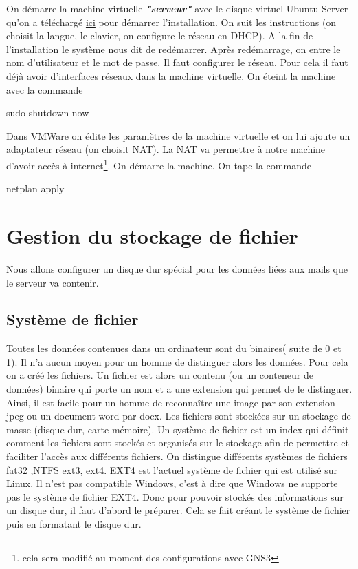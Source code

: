 \documentclass[a4paper,12pt,french]{report} %
\begin{document}
	On démarre la machine virtuelle \emph{\textbf{"serveur"}} avec le disque virtuel Ubuntu Server qu'on a téléchargé \href{https://my.vmware.com/en/web/vmware/free}{ici} pour démarrer l'installation. On suit les instructions (on choisit la langue, le clavier, on configure le réseau en DHCP). A la fin de l'installation le système nous dit de redémarrer. Après redémarrage, on entre le nom d'utilisateur et le mot de passe. Il faut configurer le réseau. 
Pour cela il faut déjà avoir d'interfaces réseaux dans la machine virtuelle. On éteint la machine avec la commande 
\begin{exempleConsole}
	sudo shutdown now 
\end{exempleConsole}
Dans VMWare on édite les paramètres de la machine virtuelle et on lui ajoute %
un adaptateur réseau (on choisit NAT). La NAT va permettre à notre machine d'avoir accès à internet\footnote{cela sera modifié au moment des configurations avec GNS3}. On démarre la machine. On tape la commande
\begin{exempleConsole}
netplan apply
\end{exempleConsole}

\section{Gestion du stockage de fichier}
	Nous allons configurer un disque dur spécial pour les données liées aux mails que le serveur va contenir.
	
\subsection{Système de fichier}
	Toutes les données contenues dans un ordinateur sont du binaires( suite de 0 et 1). Il n'a aucun moyen pour un homme de distinguer alors les données. Pour cela on a créé les fichiers. Un fichier est alors un contenu (ou un conteneur de données) binaire qui porte un nom et a une extension qui permet de le distinguer. Ainsi, il est facile pour un homme de reconnaître une image par son extension jpeg ou un document word par docx. Les fichiers sont stockées sur un stockage de masse (disque dur, carte mémoire). Un système de fichier est un index qui définit comment les fichiers sont stockés et organisés sur le stockage afin de permettre et faciliter l'accès aux différents fichiers. On distingue différents systèmes de fichiers fat32 ,NTFS ext3, ext4. EXT4 est l'actuel système de fichier qui est utilisé sur Linux. Il n'est pas compatible Windows, c'est à dire que Windows ne supporte pas le système de fichier EXT4. Donc pour pouvoir stockés des informations sur un disque dur, il faut d'abord le préparer. Cela se fait créant le système de fichier puis en formatant le disque dur.
\end{document}
